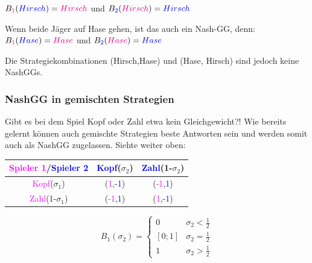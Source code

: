 \documentclass[11pt]{article}
\begin{document}
\(B_{\textcolor{magenta}{1}}(\textcolor{blue}{Hirsch}) = \textcolor{magenta}{Hirsch}\)
und
\(B_{\textcolor{blue}{2}}(\textcolor{magenta}{Hirsch}) = \textcolor{blue}{Hirsch}\)

Wenn beide Jäger auf Hase gehen, ist das auch ein Nash-GG, denn:
\(B_{\textcolor{magenta}{1}}(\textcolor{blue}{Hase}) = \textcolor{magenta}{Hase}\)
und
\(B_{\textcolor{blue}{2}}(\textcolor{magenta}{Hase}) = \textcolor{blue}{Hase}\)

Die Strategiekombinationen (Hirsch,Hase) und (Hase, Hirsch) sind jedoch keine NashGGs.

\subsubsection{NashGG in gemischten Strategien}
\label{sec:org9f02174}
Gibt es bei dem Spiel Kopf oder Zahl etwa kein Gleichgewicht?! Wie bereits gelernt können auch gemischte Strategien beste Antworten sein und werden somit auch als NashGG zugelassen.
Siehte weiter oben:
\begin{center}
\begin{tabular}{c|c|c}
\textcolor{magenta}{Spieler 1}/\textcolor{blue}{Spieler 2} & \textcolor{blue}{Kopf}(\(\sigma_{\text{2}}\)) & \textcolor{blue}{Zahl}(1-\(\sigma_{\text{2}}\))\\
\hline
\textcolor{magenta}{Kopf}(\(\sigma_{\text{1}}\)) & (\textcolor{magenta}{1},\textcolor{blue}{-1}) & (\textcolor{magenta}{-1},\textcolor{blue}{1})\\
\textcolor{magenta}{Zahl}(1-\(\sigma_{\text{1}}\)) & (\textcolor{magenta}{-1},\textcolor{blue}{1}) & (\textcolor{magenta}{1},\textcolor{blue}{-1})\\
\end{tabular}
\end{center}

\[ B_1(\sigma_2) =\begin{cases} 
      0 & \sigma_2 < \frac{1}{2} \\
      [0;1] & \sigma_2 = \frac{1}{2} \\
      1 & \sigma_2 > \frac{1}{2} 
   \end{cases}
\]
\end{document}

